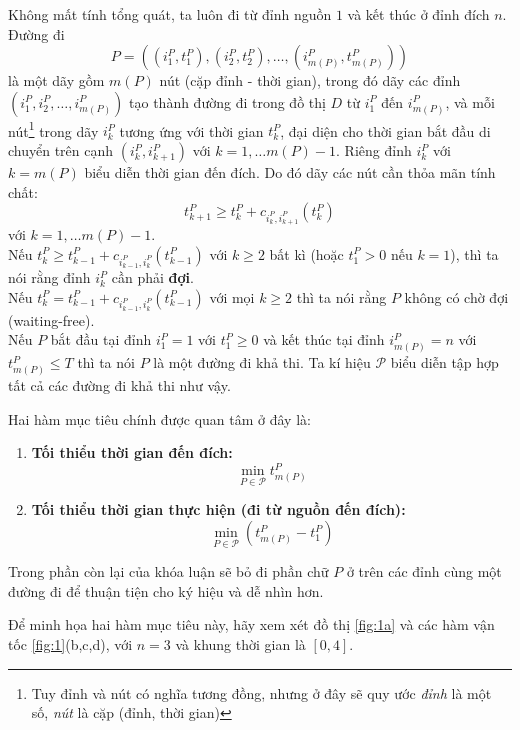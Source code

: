 \documentclass[../main.tex]{subfiles}
\begin{document}
Không mất tính tổng
quát, ta luôn đi từ đỉnh nguồn \(1\) và kết thúc ở đỉnh đích
\(n\). Đường đi
\[
  P=((i_1^P, t_1^P), (i_2^P, t_2^P), \dots, (i_{m(P)}^P, t_{m(P)}^P))
\]
là một dãy gồm \(m(P)\) nút (cặp đỉnh - thời gian), trong đó dãy các đỉnh
\((i_1^P, i_2^P, \dots, i_{m(P)}^P)\) tạo thành đường đi trong đồ thị
\(D\) từ \(i_1^P\) đến \(i_{m(P)}^P\), và mỗi nút\footnote{Tuy đỉnh và nút có nghĩa tương đồng, nhưng ở đây sẽ quy ước \emph{đỉnh} là một số, \emph{nút} là cặp (đỉnh, thời gian)} trong dãy \(i_k^P\)
tương ứng với thời gian \(t_k^P\), đại diện cho thời gian bắt đầu di
chuyển trên cạnh \((i_k^P, i_{k+1}^P)\) với \(k=1, \dots m(P)-1\). Riêng
đỉnh \(i_k^P\) với \(k=m(P)\) biểu diễn thời gian đến đích. Do đó dãy
các nút cần thỏa mãn tính chất:
\[t_{k+1}^P \ge t_k^P + c_{i_k^P, i_{k+1}^P}(t_k^P)\] với
\(k=1, \dots m(P)-1\). \\
Nếu
\(t_{k}^P \ge t_{k-1}^P + c_{i_{k-1}^P, i_{k}^P}(t_{k-1}^P)\) với \(k \ge 2\) bất kì (hoặc \(t_1^P > 0\) nếu \(k=1\)), thì ta nói rằng đỉnh \(i_k^P\)
cần phải \textbf{đợi}.\\ 
Nếu \(t_{k}^P = t_{k-1}^P + c_{i_{k-1}^P, i_{k}^P}(t_{k-1}^P)\) với mọi
\(k \ge 2\) thì ta nói rằng \(P\) không có chờ đợi (waiting-free). \\
Nếu \(P\) bắt đầu tại đỉnh \(i_1^P = 1\) với \(t_1^P\ge0\) và kết thúc tại
đỉnh \(i_{m(P)}^P=n\) với \(t_{m(P)}^P \le T\) thì ta nói \(P\) là một
đường đi khả thi. Ta kí hiệu \(\mathcal{P}\) biểu diễn tập hợp tất cả các
đường đi khả thi như vậy.

Hai hàm mục tiêu chính được quan tâm ở đây là:

\begin{enumerate}
\def\labelenumi{\arabic{enumi}.}
\tightlist
\item
  \textbf{Tối thiểu thời gian đến đích:}
  \[\min_{P\in \mathcal P}t_{m(P)}^P\]
\item
  \textbf{Tối thiểu thời gian thực hiện (đi từ nguồn đến đích):}
  \[\min_{P\in \mathcal P}(t_{m(P)}^P-t_1^P)\]
\end{enumerate}

Trong phần còn lại của khóa luận sẽ bỏ đi phần chữ \(P\) ở trên các đỉnh cùng một đường đi để thuận tiện cho ký hiệu và dễ nhìn
hơn.

Để minh họa hai hàm mục tiêu này, hãy xem xét đồ thị \autoref{fig:1a} và các hàm vận tốc 
\autoref{fig:1}(b,c,d), với \(n = 3\) và khung thời gian
là \([0, 4]\).
\end{document}
